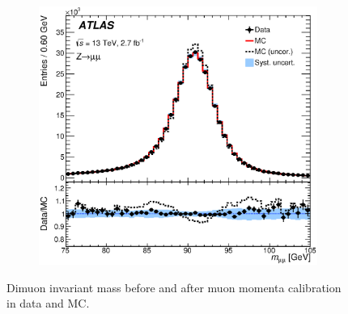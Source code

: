 \begin{figure}[h!]
\begin{center}
\begin{subfigure}[b]{0.40\textwidth}
    \includegraphics[width=\textwidth]{figures/MuonReco/ZMass.eps}
        \caption{ }
    \end{subfigure}
\end{center}
\caption[Dimuon invariant mass before and after muon momenta calibration in data and MC]{Dimuon invariant mass before and after muon momenta calibration in data and MC.\cite{MuonReco}}
\label{fig:muonCalib} 
\end{figure}